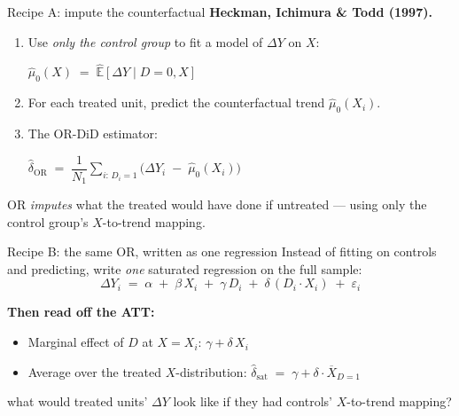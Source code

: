 \documentclass[aspectratio=169,11pt]{beamer}
\begin{document}
\begin{frame}{Recipe A: impute the counterfactual}
\vspace{0.5em}
\textbf{Heckman, Ichimura \& Todd (1997).}
\vspace{0.4em}
\begin{enumerate}
  \item Use \textit{only the control group} to fit a model of $\Delta Y$ on $X$:
  \begin{center}\small $\widehat{\mu}_0(X) \;=\; \widehat{\mathbb{E}}[\Delta Y \mid D{=}0, X]$ \end{center}
  \item For each treated unit, predict the counterfactual trend $\widehat{\mu}_0(X_i)$.
  \item The OR-DiD estimator:
  \begin{center}
  \small
  $\widehat{\delta}_{\text{OR}} \;=\; \dfrac{1}{N_1}\displaystyle\sum_{i:\, D_i=1}\big(\Delta Y_i \;-\; \widehat{\mu}_0(X_i)\big)$
  \end{center}
\end{enumerate}
\vspace{0.4em}
 OR \textit{imputes} what the treated would have done if untreated --- using only the control group's $X$-to-trend mapping.
\end{frame}

\begin{frame}{Recipe B: the same OR, written as one regression}
\footnotesize
Instead of fitting on controls and predicting, write \textit{one} saturated regression on the full sample:
\vspace{0.2em}
\[
\Delta Y_i \;=\; \alpha \;+\; \beta\, X_i \;+\; \gamma\, D_i \;+\; \delta\, (D_i \cdot X_i) \;+\; \varepsilon_i
\]
\vspace{0.1em}

\textbf{Then read off the ATT:}
\begin{itemize}\setlength\itemsep{1pt}\footnotesize
  \item Marginal effect of $D$ at $X = X_i$: \quad $\gamma + \delta\, X_i$
  \item Average over the treated $X$-distribution: \quad $\widehat\delta_{\text{sat}} \;=\; \gamma + \delta \cdot \overline{X}_{D=1}$
\end{itemize}

\vspace{0.6em}
 \;what would treated units' $\Delta Y$ look like if they had controls' $X$-to-trend mapping?

\vspace{0.4em}
\end{frame}
\end{document}
